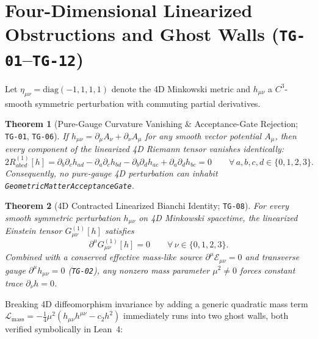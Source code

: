\documentclass[11pt,a4paper]{article}
\theoremstyle{plain}
\newtheorem{theorem}{Theorem}[section]
\theoremstyle{remark}
\newcommand{\dd}{\partial}
\newcommand{\code}[1]{\texttt{\small #1}}
\begin{document}
\section{Four-Dimensional Linearized Obstructions and Ghost Walls (\code{TG-01}--\code{TG-12})}
\label{sec:4d-obstructions}

Let $\eta_{\mu\nu} = \mathrm{diag}(-1,1,1,1)$ denote the 4D Minkowski metric and $h_{\mu\nu}$ a $C^3$-smooth symmetric perturbation with commuting partial derivatives.

\begin{theorem}[Pure-Gauge Curvature Vanishing \& Acceptance-Gate Rejection; \code{TG-01}, \code{TG-06}]
\label{thm:tg01}
If $h_{\mu\nu} = \dd_\mu A_\nu + \dd_\nu A_\mu$ for any smooth vector potential $A_\mu$, then every component of the linearized 4D Riemann tensor vanishes identically:
\begin{equation}
  2 R^{(1)}_{abcd}[h]
  = \dd_b\dd_c h_{ad} - \dd_a\dd_c h_{bd} - \dd_b\dd_d h_{ac} + \dd_a\dd_d h_{bc}
  = 0 \qquad \forall\, a,b,c,d \in \{0,1,2,3\}.
\end{equation}
Consequently, no pure-gauge 4D perturbation can inhabit \code{GeometricMatterAcceptanceGate}.
\end{theorem}

\begin{theorem}[4D Contracted Linearized Bianchi Identity; \code{TG-08}]
\label{thm:tg08}
For every smooth symmetric perturbation $h_{\mu\nu}$ on 4D Minkowski spacetime, the linearized Einstein tensor $G^{(1)}_{\mu\nu}[h]$ satisfies
\begin{equation}
  \dd^\mu G^{(1)}_{\mu\nu}[h] = 0 \qquad \forall\, \nu \in \{0,1,2,3\}.
\end{equation}
Combined with a conserved effective mass-like source $\dd^\mu \mathcal{E}_{\mu\nu} = 0$ and transverse gauge $\dd^\mu h_{\mu\nu} = 0$ (\code{TG-02}), any nonzero mass parameter $\mu^2 \neq 0$ forces constant trace $\dd_\nu h = 0$.
\end{theorem}

Breaking 4D diffeomorphism invariance by adding a generic quadratic mass term $\mathcal{L}_{\mathrm{mass}} = -\tfrac{1}{4}\mu^2 (h_{\mu\nu}h^{\mu\nu} - c_2 h^2)$ immediately runs into two ghost walls, both verified symbolically in Lean~4:
\end{document}
